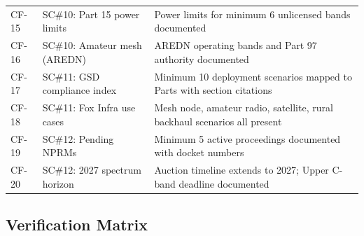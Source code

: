 \documentclass[11pt,letterpaper]{article}
\begin{document}
\begin{center}
\begin{tabularx}{\textwidth}{C{1.5cm}L{4cm}X}
CF-15 & SC\#10: Part 15 power limits & Power limits for minimum 6 unlicensed bands documented \\
CF-16 & SC\#10: Amateur mesh (AREDN) & AREDN operating bands and Part 97 authority documented \\
CF-17 & SC\#11: GSD compliance index & Minimum 10 deployment scenarios mapped to Parts with section citations \\
CF-18 & SC\#11: Fox Infra use cases & Mesh node, amateur radio, satellite, rural backhaul scenarios all present \\
CF-19 & SC\#12: Pending NPRMs & Minimum 5 active proceedings documented with docket numbers \\
CF-20 & SC\#12: 2027 spectrum horizon & Auction timeline extends to 2027; Upper C-band deadline documented \\
\bottomrule
\end{tabularx}
\end{center}

\subsection{Verification Matrix}
\end{document}
